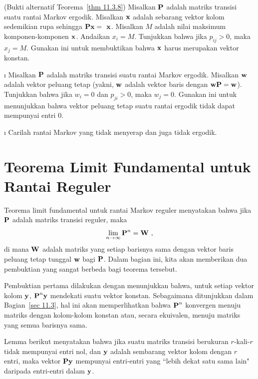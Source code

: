\begin{LJSItem}
\istar\label{exer 11.3.30} (Bukti alternatif Teorema~\ref{thm 11.3.8})
Misalkan ${\mbox{\bf P}\/}$ adalah matriks transisi suatu rantai Markov ergodik. Misalkan
${\mbox{\bf x}\/}$ adalah sebarang vektor kolom sedemikian rupa sehingga
$\mat{P}
\mat{x} =
\mat{ x}$. Misalkan $M$ adalah nilai maksimum komponen-komponen ${\mbox{\bf x}\/}$.
Andaikan $x_i = M$. Tunjukkan bahwa jika $p_{ij} > 0$, maka $x_j = M$.
Gunakan ini untuk membuktikan bahwa ${\mbox{\bf x}\/}$ harus merupakan vektor konstan.

\i\label{exer 11.3.31} Misalkan ${\mbox{\bf P}\/}$ adalah matriks transisi suatu rantai
Markov ergodik. Misalkan ${\mbox{\bf w}\/}$ adalah vektor peluang tetap (yakni,
${\mbox{\bf w}\/}$ adalah vektor baris dengan ${\mbox{\bf w}\/}{\mbox{\bf P}\/} = {\mbox{\bf w}\/}$).
Tunjukkan bahwa jika $w_i = 0$ dan $p_{ji} > 0$, maka $w_j = 0$. Gunakan ini
untuk menunjukkan bahwa vektor peluang tetap suatu rantai ergodik tidak dapat
mempunyai entri 0.

\i\label{exer 11.3.32} Carilah rantai Markov yang tidak menyerap dan juga tidak
ergodik.

\end{LJSItem}

\section[Teorema Limit Fundamental]{Teorema Limit Fundamental untuk Rantai
\newline Reguler}\label{sec 11.4}

Teorema limit fundamental untuk rantai Markov reguler menyatakan bahwa jika
${\mbox{\bf P}\/}$ adalah
matriks transisi reguler, maka
$$
\lim_{n \to \infty} {\mbox{\bf P}\/}^n = {\mbox{\bf W}\/}\ ,
$$
di mana ${\mbox{\bf W}\/}$ adalah matriks yang setiap barisnya sama dengan vektor baris
peluang tetap tunggal
${\mbox{\bf w}\/}$ bagi ${\mbox{\bf P}\/}$. Dalam bagian ini, kita akan memberikan dua
pembuktian yang sangat berbeda bagi
teorema tersebut.
\par
Pembuktian pertama dilakukan dengan menunjukkan bahwa, untuk setiap vektor kolom
${\mbox{\bf y}\/}$,
${\mbox{\bf P}\/}^n {\mbox{\bf y}\/}$ mendekati suatu vektor konstan. Sebagaimana ditunjukkan dalam
Bagian~\ref{sec 11.3}, hal ini
akan memperlihatkan bahwa ${\mbox{\bf P}\/}^n$ konvergen menuju matriks dengan
kolom-kolom konstan atau, secara ekuivalen, menuju
matriks yang semua barisnya sama.
\par
Lemma berikut menyatakan bahwa jika suatu matriks transisi berukuran $r$-kali-$r$
tidak mempunyai entri nol,
dan ${\mbox{\bf y}\/}$ adalah sembarang vektor kolom dengan $r$ entri, maka vektor ${\mbox{\bf P}\/}{\mbox{\bf y}\/}$ mempunyai
entri-entri yang ``lebih dekat satu sama lain" daripada entri-entri dalam ${\mbox{\bf y}\/}$.


